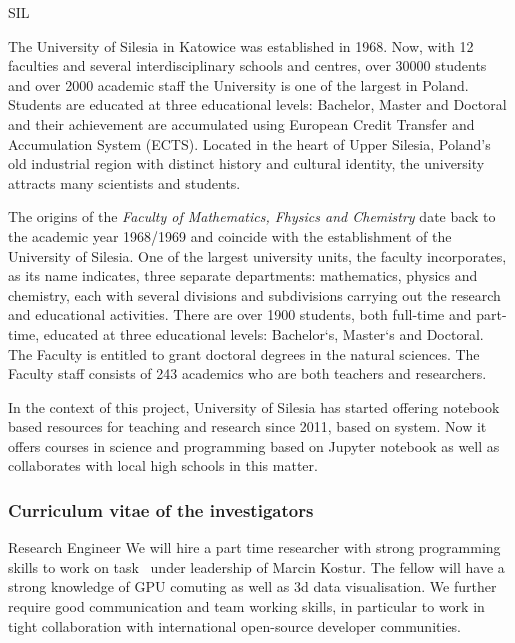 \begin{sitedescription}{SIL}\label{desc:SIL}

The University of Silesia in Katowice was established in 1968. Now,
with 12 faculties and several interdisciplinary schools and centres,
over 30000 students and over 2000 academic staff the University is one
of the largest in Poland. Students are educated at three educational
levels: Bachelor, Master and Doctoral and their achievement are
accumulated using European Credit Transfer and Accumulation System
(ECTS). Located in the heart of Upper Silesia, Poland's old industrial
region with distinct history and cultural identity, the university
attracts many scientists and students.

The origins of the {\em Faculty of Mathematics, Fhysics and Chemistry} date
back to the academic year 1968/1969 and coincide with the
establishment of the University of Silesia. One of the largest
university units, the faculty incorporates, as its name indicates,
three separate departments: mathematics, physics and chemistry, each
with several divisions and subdivisions carrying out the research and
educational activities. There are over 1900 students, both full-time
and part-time, educated at three educational levels: Bachelor`s,
Master`s and Doctoral. The Faculty is entitled to grant doctoral
degrees in the natural sciences. The Faculty staff consists of 243
academics who are both teachers and researchers.


In the context of this project, University of Silesia has started offering notebook based resources for teaching and research since 2011, based on \Sage system. Now it offers courses in science and programming based on Jupyter notebook as well as collaborates with local high schools in this matter. 


\subsubsection*{Curriculum vitae of the investigators}




\begin{participant}[type=R,PM=15,salary=2500]{Research Engineer}
    We will hire a part time researcher with strong programming skills to work on task~ under leadership of Marcin Kostur. 
The fellow will have a strong knowledge of GPU comuting as well as 3d data visualisation. 
We further require good communication and team working skills, in particular to work in tight collaboration with international open-source developer communities.
\end{participant}


\end{sitedescription}
